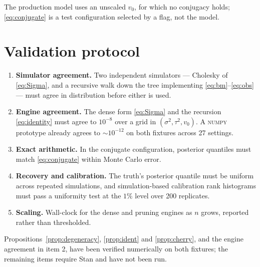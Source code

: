 \documentclass[11pt]{article}
\theoremstyle{remark}
\begin{document}
The production model uses an unscaled $v_0$, for which no conjugacy holds; \eqref{eq:conjugate} is a
test configuration selected by a flag, not the model.

\section{Validation protocol}

\begin{enumerate}
  \item \textbf{Simulator agreement.} Two independent simulators --- Cholesky of \eqref{eq:Sigma},
        and a recursive walk down the tree implementing \eqref{eq:bm}--\eqref{eq:obs} --- must agree
        in distribution before either is used.
  \item \textbf{Engine agreement.} The dense form \eqref{eq:Sigma} and the recursion
        \eqref{eq:identity} must agree to $10^{-8}$ over a grid in
        $(\sigma^2,\tau^2,v_0)$. A \textsc{numpy} prototype already agrees to $\sim 10^{-12}$ on both
        fixtures across 27 settings.
  \item \textbf{Exact arithmetic.} In the conjugate configuration, posterior quantiles must match
        \eqref{eq:conjugate} within Monte Carlo error.
  \item \textbf{Recovery and calibration.} The truth's posterior quantile must be uniform across
        repeated simulations, and simulation-based calibration rank histograms must pass a
        uniformity test at the $1\%$ level over 200 replicates.
  \item \textbf{Scaling.} Wall-clock for the dense and pruning engines as $n$ grows, reported rather
        than thresholded.
\end{enumerate}

Propositions~\ref{prop:degeneracy}, \ref{prop:ident} and \ref{prop:cherry}, and the engine agreement
in item 2, have been verified numerically on both fixtures; the remaining items require Stan and have
not been run.
\end{document}
